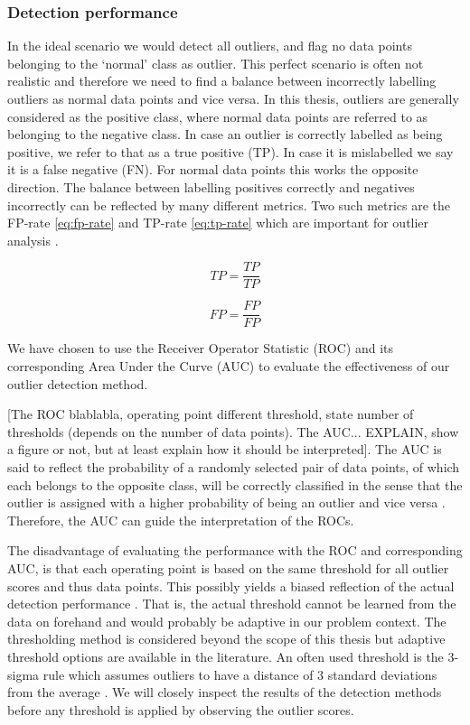 \subsubsection{Detection performance}
In the ideal scenario we would detect all outliers, and flag no data points belonging to the `normal' class as outlier. This perfect scenario is often not realistic and therefore we need to find a balance between incorrectly labelling outliers as normal data points and vice versa. In this thesis, outliers are generally considered as the positive class, where normal data points are referred to as belonging to the negative class. In case an outlier is correctly labelled as being positive, we refer to that as a true positive (TP). In case it is mislabelled we say it is a false negative (FN). For normal data points this works the opposite direction. The balance between labelling positives correctly and negatives incorrectly can be reflected by many different metrics. Two such metrics are the FP-rate \eqref{eq:fp-rate} and TP-rate \eqref{eq:tp-rate} which are important for outlier analysis \cite{aggarwal2015outlier}. 

\begin{equation}
\label{eq:tp-rate}
TP = \frac{TP}{TP}
\end{equation}

\begin{equation}
\label{eq:fp-rate}
FP = \frac{FP}{FP}
\end{equation}

We have chosen to use the Receiver Operator Statistic (ROC) and its corresponding Area Under the Curve (AUC) to evaluate the effectiveness of our outlier detection method.

[The ROC blablabla, operating point different threshold, state number of thresholds (depends on the number of data points). The AUC... EXPLAIN, show a figure or not, but at least explain how it should be interpreted].
The AUC is said to reflect the probability of a randomly selected pair of data points, of which each belongs to the opposite class, will be correctly classified in the sense that the outlier is assigned with a higher probability of being an outlier and vice versa \cite{hanley1982meaning}. Therefore, the AUC can guide the interpretation of the ROCs.


The disadvantage of evaluating the performance with the ROC and corresponding AUC, is that each operating point is based on the same threshold for all outlier scores and thus data points. This possibly yields a biased reflection of the actual detection performance \cite{mchugh2000testing}. That is, the actual threshold cannot be learned from the data on forehand and would probably be adaptive in our problem context. The thresholding method is considered beyond the scope of this thesis but adaptive threshold options are available in the literature. An often used threshold is the 3-sigma rule which assumes outliers to have a distance of 3 standard deviations from the average \cite{zimek2012survey}. We will closely inspect the results of the detection methods before any threshold is applied by observing the outlier scores.

